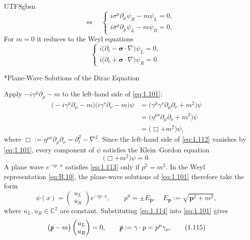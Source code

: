 \documentclass[11pt,a4paper,oneside]{report}
\makeatletter
\newcommand\topic{\@startsection{paragraph}{4}{\z@}{-1.7ex plus -.3ex}{.5ex}{\normalfont\normalsize\bfseries\itshape\boldmath}*}
\makeatother
\begin{document}
\begin{CJK*}{UTF8}{gbsn}
\begin{equation*}
\quad\Longleftrightarrow\quad
\begin{cases}
i\sigma^\mu\partial_\mu\psi_R-m\psi_L=0,\\
i\bar\sigma^\mu\partial_\mu\psi_L-m\psi_R=0.
\end{cases}
\tag{1.110}\label{eq:1.110}
\end{equation*}
For $m=0$ it reduces to the Weyl equations
\begin{equation*}
\begin{cases}
i\bigl(\partial_t-\boldsymbol\sigma\cdot\nabla\bigr)\psi_L=0,\\
i\bigl(\partial_t+\boldsymbol\sigma\cdot\nabla\bigr)\psi_R=0.
\end{cases}
\tag{1.111}\label{eq:1.111}
\end{equation*}

\topic{Plane-Wave Solutions of the Dirac Equation}

Apply $-i\gamma^\mu\partial_\mu-m$ to the left-hand side of \eqref{eq:1.101}:
\begin{equation*}
\begin{aligned}
\bigl(-i\gamma^\mu\partial_\mu-m\bigr)\bigl(i\gamma^\nu\partial_\nu-m\bigr)\psi
&=\bigl(\gamma^\mu\gamma^\nu\partial_\mu\partial_\nu+m^2\bigr)\psi\\
&=\bigl(\eta^{\mu\nu}\partial_\mu\partial_\nu+m^2\bigr)\psi\\
&=\bigl(\Box+m^2\bigr)\psi,
\end{aligned}
\tag{1.112}\label{eq:1.112}
\end{equation*}
where $\Box:=\eta^{\mu\nu}\partial_\mu\partial_\nu=\partial_t^2-\nabla^2$. Since the left-hand side of \eqref{eq:1.112} vanishes by \eqref{eq:1.101}, every component of $\psi$ satisfies the Klein–Gordon equation
\begin{equation*}
\bigl(\Box+m^2\bigr)\psi=0.
\tag{1.113}\label{eq:1.113}
\end{equation*}
A plane wave $e^{-ip\cdot x}$ satisfies \eqref{eq:1.113} only if $p^2=m^2$. In the Weyl representation \eqref{eq:B.10}, the plane-wave solutions of \eqref{eq:1.101} therefore take the form
\begin{equation*}
\psi(x)=\begin{pmatrix}u_L\\u_R\end{pmatrix}e^{-ip\cdot x},
\qquad
p^0=\pm E_{\mathbf p},\quad
E_{\mathbf p}:=\sqrt{\mathbf p^2+m^2},
\tag{1.114}\label{eq:1.114}
\end{equation*}
where $u_L,u_R\in\mathbb C^2$ are constant. Substituting \eqref{eq:1.114} into \eqref{eq:1.101} gives
\begin{equation*}
\bigl(\slashed{p}-m\bigr)\begin{pmatrix}u_L\\u_R\end{pmatrix}=0,
\qquad
\slashed{p}:=\gamma\cdot p=p^\mu\gamma_\mu.
\tag{1.115}\label{eq:1.115}
\end{equation*}


\end{CJK*}
\end{document}

